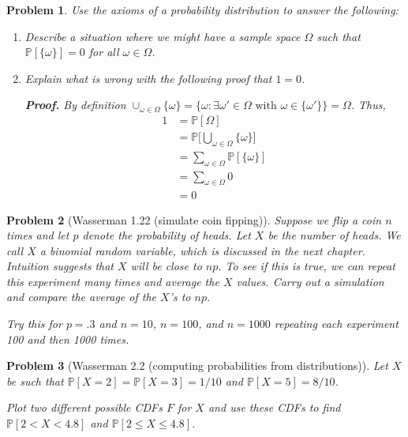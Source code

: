 \documentclass{article}
\newtheorem{problem}{Problem}
\newcommand{\PP}{\mathbb{P}}
\begin{document}
\begin{problem}
    Use the axioms of a probability distribution to answer the following:
    \begin{enumerate}[label=(\alph*),topsep=0pt]
        \item Describe a situation where we might have a sample space $\Omega$ such that $\PP[\{\omega\}] = 0$ for all $\omega\in\Omega$.
        \item 
            Explain what is wrong with the following proof that $1=0$.
            
            \textbf{Proof.} By definition $\cup_{\omega \in \Omega} \{\omega\} = \{ \omega : \exists \omega' \in \Omega \text{ with } \omega \in \{\omega' \} \} = \Omega$.
            Thus,
            \begin{align*}
                1 &= \PP[\Omega] \tag{Axiom 2}
                \\&= \PP\bigg[\bigcup_{\omega \in \Omega} \{ \omega\}\bigg]  \tag{definition of union}
                \\&= \sum_{\omega \in \Omega} \PP[\{\omega\} ] \tag{Axiom 3} 
                \\&= \sum_{\omega \in \Omega} 0  \tag{assumption} 
                \\&= 0 \tag*{\qed}
            \end{align*}
    \end{enumerate}
\end{problem}

\begin{problem}[Wasserman 1.22 (simulate coin fipping)]
Suppose we flip a coin $n$ times and let $p$ denote
the probability of heads. Let $X$ be the number of heads. We call $X$
a binomial random variable, which is discussed in the next chapter.
Intuition suggests that $X$ will be close to $np$. To see if this is true, we
can repeat this experiment many times and average the $X$ values. Carry
out a simulation and compare the average of the $X$'s to $np$. 

Try this for
$p =.3$ and $n = 10$, $n = 100$, and $n = 1000$ repeating each experiment 100 and then 1000 times.
\end{problem}

\begin{problem}[Wasserman 2.2 (computing probabilities from distributions)]
    Let $X$ be such that $\PP[X=2] = \PP[X=3] = 1/10$ and $\PP[X=5] = 8/10$.

    Plot two different possible CDFs $F$ for $X$ and use these CDFs to find $\PP[2<X<4.8]$ and $\PP[2\leq X\leq 4.8]$.

\end{problem}
\end{document}
